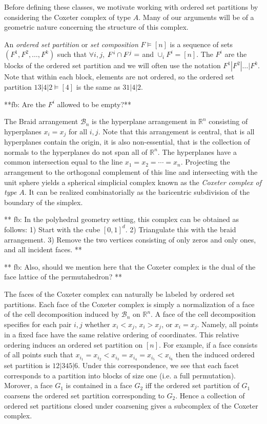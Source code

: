 \documentclass[12pt]{amsart}
\begin{document}
Before defining these classes, we motivate working with ordered set
partitions by considering the Coxeter complex of type $A$.  Many of
our arguments will be of a geometric nature concerning the structure
of this complex.


An \emph{ordered set partition} or \emph{set composition} $F \vDash
[n]$ is a sequence of sets $(F^1,F^2, \ldots, F^k)$ such that $\forall
i,j$, $ F^i \cap F^j = \empty$ and $\cup_i F^i = [n]$.  The $F^i$ are the
blocks of the ordered set partition and we will often use the notation
$F^1 | F^2 | \ldots | F^k$.  Note that within each block, elements are
not ordered, so the ordered set partition $13|4|2 \vDash [4]$ is the
same as $31|4|2$.

**fb: Are the $F^i$ allowed to be empty?**


The Braid arrangement $\mathcal{B}_n$ is the hyperplane arrangement in
$\mathbb{R}^n$ consisting of hyperplanes $x_i = x_j$ for all $i,j$.
Note that this arrangement is central, that is all hyperplanes contain
the origin, it is also non-essential, that is the collection of
normals to the hyperplanes do not span all of $\mathbb{R}^n$.  The
hyperplanes have a common intersection equal to the line $x_1 = x_2 = \cdots
= x_n$.  Projecting the arrangement to the orthogonal complement of
this line and intersecting with the unit sphere yields a spherical
simplicial complex known as the \emph{Coxeter complex of type $A$}.
It can be realized combinatorially as the baricentric subdivision of the
boundary of the simplex. 

** fb: In the polyhedral geometry setting, this complex
can be obtained as follows: 1) Start with the cube $[0,1]^d$. 2) Triangulate 
this with the braid arrangement. 3) Remove the two vertices consisting of 
only zeros and only ones, and all incident faces. **

** fb: Also, should we mention here that the Coxeter complex is the dual of the face lattice of the permutahedron? **

The faces of the Coxeter complex can naturally be labeled by ordered
set partitions.  Each face of the Coxeter complex is simply a
normalization of a face of the cell decomposition induced by
$\mathcal{B}_n$ on $\mathbb{R}^n$.  A face of the cell decomposition specifies for each pair $i,j$ whether $x_i < x_j$, $x_i > x_j$, or $x_i = x_j$.  Namely, all points in a fixed face have
the same relative ordering of coordinates.  This relative ordering
induces an ordered set partition on $[n]$.  For example, if a face
consists of all points such that $x_{i_1} = x_{i_2} < x_{i_3} =
x_{i_4} = x_{i_5} < x_{i_6}$ then the induced ordered set partition is
$12|345|6$.  Under this correspondence, we see that each facet
corresponds to a partition into blocks of size one (i.e. a full
permutation).  Morover, a face $G_1$ is contained in a face $G_2$ iff
the ordered set partition of $G_1$ coarsens the ordered set partition
corresponding to $G_2$.  Hence a collection of ordered set partitions
closed under coarsening gives a subcomplex of the Coxeter complex.
\end{document}
